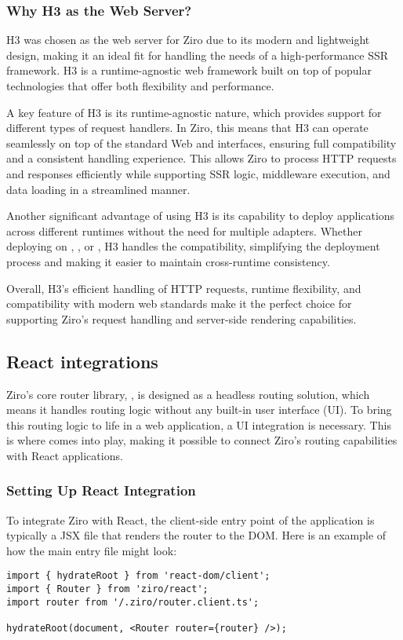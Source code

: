 \subsubsection{Why H3 as the Web Server?}

H3 was chosen as the web server for Ziro due to its modern and lightweight design, making it an ideal fit for handling the needs of a high-performance SSR framework. H3 is a runtime-agnostic web framework built on top of popular technologies that offer both flexibility and performance.

A key feature of H3 is its runtime-agnostic nature, which provides support for different types of request handlers. In Ziro, this means that H3 can operate seamlessly on top of the standard Web  and  interfaces, ensuring full compatibility and a consistent handling experience. This allows Ziro to process HTTP requests and responses efficiently while supporting SSR logic, middleware execution, and data loading in a streamlined manner.

Another significant advantage of using H3 is its capability to deploy applications across different runtimes without the need for multiple adapters. Whether deploying on , , or , H3 handles the compatibility, simplifying the deployment process and making it easier to maintain cross-runtime consistency.

Overall, H3's efficient handling of HTTP requests, runtime flexibility, and compatibility with modern web standards make it the perfect choice for supporting Ziro’s request handling and server-side rendering capabilities.

\subsection{React integrations}

Ziro’s core router library, , is designed as a headless routing solution, which means it handles routing logic without any built-in user interface (UI). To bring this routing logic to life in a web application, a UI integration is necessary. This is where  comes into play, making it possible to connect Ziro’s routing capabilities with React applications.

\subsubsection{Setting Up React Integration}
To integrate Ziro with React, the client-side entry point of the application is typically a JSX file that renders the router to the DOM. Here is an example of how the main entry file might look:
\begin{verbatim}
import { hydrateRoot } from 'react-dom/client';
import { Router } from 'ziro/react';
import router from '/.ziro/router.client.ts';

hydrateRoot(document, <Router router={router} />);
\end{verbatim}

